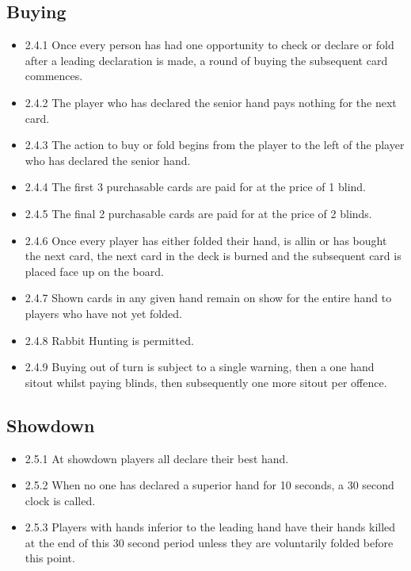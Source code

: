 \documentclass[a4paper,12pt]{article}
\begin{document}
\subsection{Buying}
\begin{itemize}
\item 2.4.1 Once every person has had one opportunity to check or declare or fold after a leading declaration is made, a round of buying the subsequent card commences.
\item 2.4.2 The player who has declared the senior hand pays nothing for the next card.
\item 2.4.3 The action to buy or fold begins from the player to the left of the player who has declared the senior hand.
\item 2.4.4 The first 3 purchasable cards are paid for at the price of 1 blind.
\item 2.4.5 The final 2 purchasable cards are paid for at the price of 2 blinds.
\item 2.4.6 Once every player has either folded their hand, is allin or has bought the next card, the next card in the deck is burned and the subsequent card is placed face up on the board.
\item 2.4.7 Shown cards in any given hand remain on show for the entire hand to players who have not yet folded.
\item 2.4.8 Rabbit Hunting is permitted.
\item 2.4.9 Buying out of turn is subject to a single warning, then a one hand sitout whilst paying blinds, then subsequently one more sitout per offence.
\end{itemize}

\subsection{Showdown}
\begin{itemize}
\item 2.5.1 At showdown players all declare their best hand.
\item 2.5.2 When no one has declared a superior hand for 10 seconds, a 30 second clock is called.
\item 2.5.3 Players with hands inferior to the leading hand have their hands killed at the end of this 30 second period unless they are voluntarily folded before this point.

\end{itemize}
\end{document}
